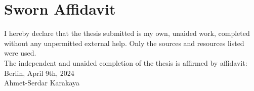
\cleardoublepage
\section*{Sworn Affidavit}

\begin{flushleft}
    I hereby declare that the thesis submitted is my own, unaided work, completed without any unpermitted external help. Only the sources and resources listed were used.\\
    \vspace{0.5cm}
    The independent and unaided completion of the thesis is affirmed by affidavit:\\
    \vspace{1.0cm}
    Berlin, April 9th, 2024
    \\
    \vspace{3.5cm}
    Ahmet-Serdar Karakaya
\end{flushleft}
 